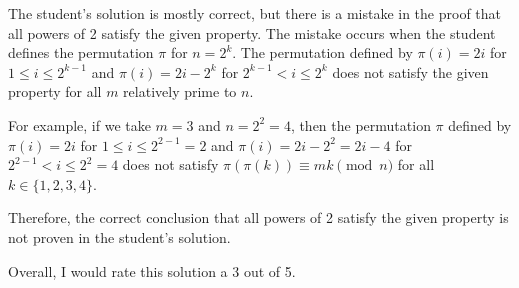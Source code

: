 The student's solution is mostly correct, but there is a mistake in the proof that all powers of 2 satisfy the given property. The mistake occurs when the student defines the permutation $\pi$ for $n = 2^k$. The permutation defined by $\pi(i) = 2i$ for $1 \leq i \leq 2^{k-1}$ and $\pi(i) = 2i - 2^{k}$ for $2^{k-1} < i \leq 2^{k}$ does not satisfy the given property for all $m$ relatively prime to $n$. 

For example, if we take $m = 3$ and $n = 2^2 = 4$, then the permutation $\pi$ defined by $\pi(i) = 2i$ for $1 \leq i \leq 2^{2-1} = 2$ and $\pi(i) = 2i - 2^{2} = 2i - 4$ for $2^{2-1} < i \leq 2^{2} = 4$ does not satisfy $\pi(\pi(k)) \equiv mk \pmod{n}$ for all $k \in \{1,2,3,4\}$.

Therefore, the correct conclusion that all powers of 2 satisfy the given property is not proven in the student's solution. 

Overall, I would rate this solution a 3 out of 5.
